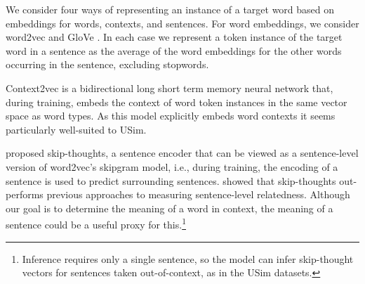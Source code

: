 \documentclass[11pt]{article}
\newcommand\glove{GloVe\xspace}
\begin{document}
We consider four ways of representing an instance of a target word
based on embeddings for words, contexts, and sentences. For word
embeddings, we consider word2vec \citep{Mikolov+:2013b} and \glove
\citep{pennington2014glove}. In each case we represent a token
instance of the target word in a sentence as the average of the word
embeddings for the other words occurring in the sentence, excluding
stopwords.

Context2vec \citep{melamud2016context2vec} is a bidirectional long
short term memory neural network that, during training, embeds the
context of word token instances in the same vector space as word
types. As this model explicitly embeds word contexts it seems
particularly well-suited to USim.

\cite{Kiros+:2015} proposed skip-thoughts, a sentence encoder that can
be viewed as a sentence-level version of word2vec's skipgram model,
i.e., during training, the encoding of a sentence is used to predict
surrounding sentences.  \citeauthor{Kiros+:2015} showed that
skip-thoughts out-performs previous approaches to measuring
sentence-level relatedness.  Although our goal is to determine the
meaning of a word in context, the meaning of a sentence could be a
useful proxy for this.\footnote{Inference requires only a single
  sentence, so the model can infer skip-thought vectors for sentences
  taken out-of-context, as in the USim datasets.}






\end{document}
